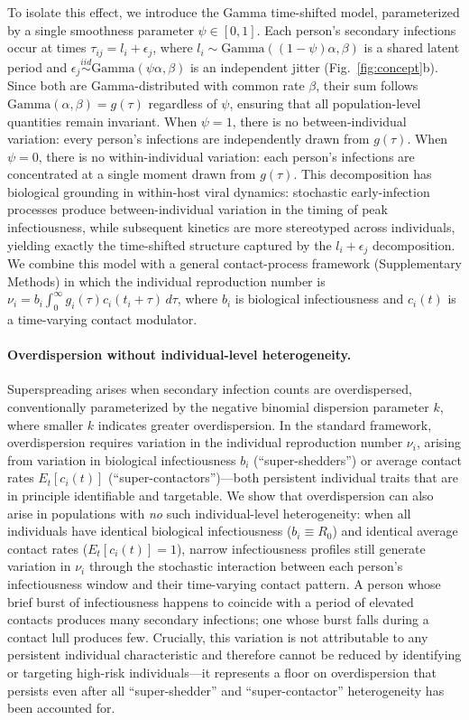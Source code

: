 \documentclass[10pt]{article}
\begin{document}
To isolate this effect, we introduce the Gamma time-shifted model, parameterized by a single smoothness parameter $\psi \in [0,1]$. Each person's secondary infections occur at times $\tau_{ij} = l_i + \epsilon_j$, where $l_i \sim \text{Gamma}((1-\psi)\alpha, \beta)$ is a shared latent period and $\epsilon_j \overset{iid}{\sim} \text{Gamma}(\psi\alpha, \beta)$ is an independent jitter (Fig.~\ref{fig:concept}b). Since both are Gamma-distributed with common rate $\beta$, their sum follows $\text{Gamma}(\alpha, \beta) = g(\tau)$ regardless of $\psi$, ensuring that all population-level quantities remain invariant. When $\psi = 1$, there is no between-individual variation: every person's infections are independently drawn from $g(\tau)$. When $\psi = 0$, there is no within-individual variation: each person's infections are concentrated at a single moment drawn from $g(\tau)$. This decomposition has biological grounding in within-host viral dynamics: stochastic early-infection processes produce between-individual variation in the timing of peak infectiousness, while subsequent kinetics are more stereotyped across individuals\citep{morris_random_2025}, yielding exactly the time-shifted structure captured by the $l_i + \epsilon_j$ decomposition. We combine this model with a general contact-process framework (Supplementary Methods) in which the individual reproduction number is $\nu_i = b_i \int_0^\infty g_i(\tau) c_i(t_i + \tau)\, d\tau$, where $b_i$ is biological infectiousness and $c_i(t)$ is a time-varying contact modulator.

\paragraph{Overdispersion without individual-level heterogeneity.}
Superspreading arises when secondary infection counts are overdispersed, conventionally parameterized by the negative binomial dispersion parameter $k$, where smaller $k$ indicates greater overdispersion\citep{lloyd-smith_superspreading_2005}. In the standard framework, overdispersion requires variation in the individual reproduction number $\nu_i$, arising from variation in biological infectiousness $b_i$ (``super-shedders'') or average contact rates $E_t[c_i(t)]$ (``super-contactors'')---both persistent individual traits that are in principle identifiable and targetable. We show that overdispersion can also arise in populations with \textit{no} such individual-level heterogeneity: when all individuals have identical biological infectiousness ($b_i \equiv R_0$) and identical average contact rates ($E_t[c_i(t)] = 1$), narrow infectiousness profiles still generate variation in $\nu_i$ through the stochastic interaction between each person's infectiousness window and their time-varying contact pattern. A person whose brief burst of infectiousness happens to coincide with a period of elevated contacts produces many secondary infections; one whose burst falls during a contact lull produces few. Crucially, this variation is not attributable to any persistent individual characteristic and therefore cannot be reduced by identifying or targeting high-risk individuals---it represents a floor on overdispersion that persists even after all ``super-shedder'' and ``super-contactor'' heterogeneity has been accounted for.
\end{document}
